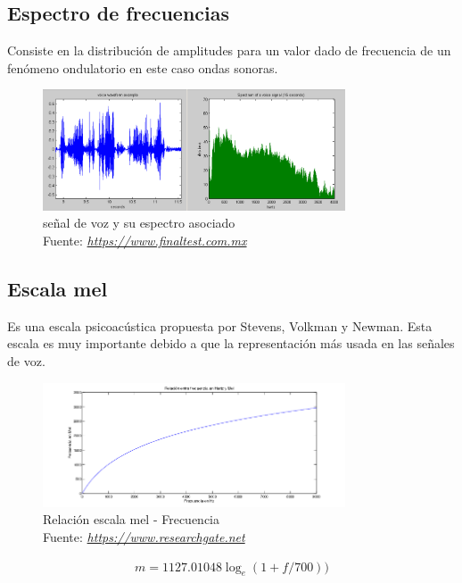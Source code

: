 \subsection{Espectro de frecuencias}
Consiste en la distribución de amplitudes para un valor dado de frecuencia de un fenómeno ondulatorio en este caso ondas sonoras.
\begin{figure}[H]
	\centering
	\includegraphics[width=0.8\textwidth]{Figures/espectro.png}
	\caption{señal de voz y su espectro asociado\\ Fuente:  \href{https://www.finaltest.com.mx/product-p/art-03.htm}{\textit{https://www.finaltest.com.mx}}}
	\label{señal}
\end{figure} 

\subsection{Escala mel}
Es una escala psicoacústica propuesta por Stevens, Volkman y Newman. Esta escala es muy importante debido a que la representación más usada en las señales de voz.
\begin{figure}[H]
	\centering
	\includegraphics[width=0.8\textwidth]{Figures/escala_mel.png}
	\caption{Relación escala mel - Frecuencia\\ Fuente:  \href{https://www.researchgate.net/figure/Relacion-entre-frecuencia-en-Hz-eje-x-y-en-escala-Mel-eje-y_fig2_312041038}{\textit{https://www.researchgate.net}}}
	\label{mel}
\end{figure} 
\begin{equation}
	\label{STg}
	\begin{aligned}
	m=1127.01048\log_{e}(1+f/700))
	\end{aligned}
\end{equation}
